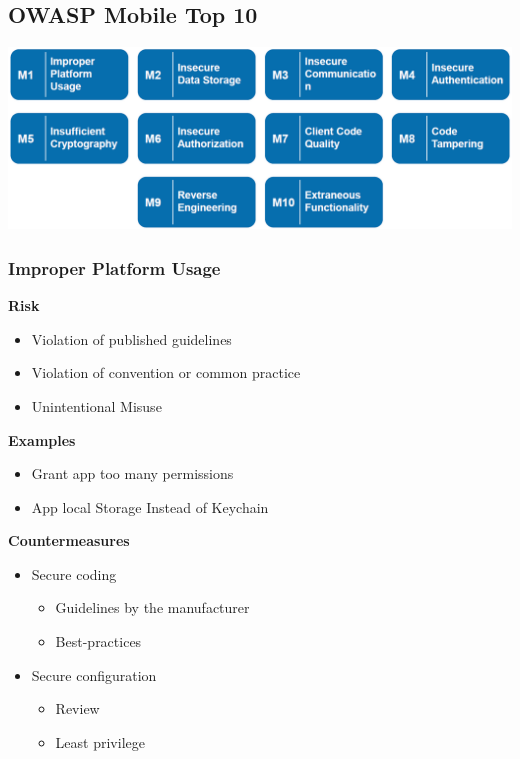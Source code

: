 \usepackage{graphicx}%

\subsection{OWASP Mobile Top 10}
\includegraphics[width=\linewidth]{../img/owasp_mobile.png}

\columnbreak
\subsubsection{Improper Platform Usage}
\textbf{Risk}
\begin{itemize}
    \item Violation of published guidelines
    \item Violation of convention or common practice
    \item Unintentional Misuse
\end{itemize}
\textbf{Examples}
\begin{itemize}
    \item Grant app too many permissions
    \item App local Storage Instead of Keychain
\end{itemize}
\textbf{Countermeasures}
\begin{itemize}
    \item Secure coding
    \begin{itemize}
        \item Guidelines by the manufacturer
        \item Best-practices
    \end{itemize}
    \item Secure configuration
    \begin{itemize}
        \item Review
        \item Least privilege
    \end{itemize}
\end{itemize}

